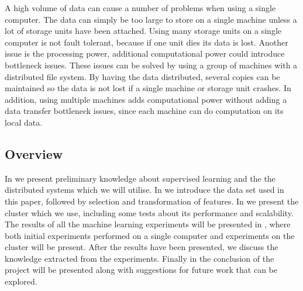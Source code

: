 A high volume of data can cause a number of problems when using a single computer. The data can simply be too large to store on a single machine unless a lot of storage units have been attached. Using many storage units on a single computer is not fault tolerant, because if one unit dies its data is lost. Another issue is the processing power, additional computational power could introduce bottleneck issues. These issues can be solved by using a group of machines with a distributed file system. By having the data distributed, several copies can be maintained so the data is not lost if a single machine or storage unit crashes. In addition, using multiple machines adds computational power without adding a data transfer bottleneck issues, since each machine can do computation on its local data.

\subsection{Overview}\label{sec:overview}
In  we present preliminary knowledge about supervised learning and the the distributed systems which we will utilise. In  we introduce the data set used in this paper, followed by selection and transformation of features. In  we present the cluster which we use, including some tests about its performance and scalability. The results of all the machine learning experiments will be presented in , where both initial experiments performed on a single computer and experiments on the cluster will be present. After the results have been presented, we discuss the knowledge extracted from the experiments. Finally in  the conclusion of the project will be presented along with suggestions for future work that can be explored.